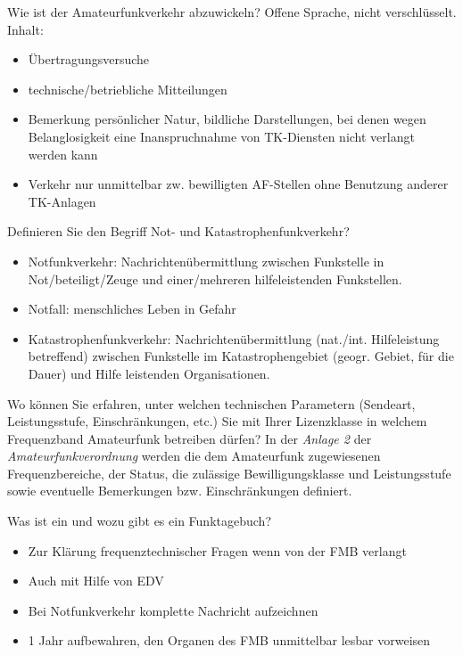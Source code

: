 \documentclass[avery5371,grid,frame,a4paper]{flashcards}
\newcommand{\card}[3]{
  \begin{flashcard}[{\chap} -- #1]{#2}#3\end{flashcard}
}
\begin{document}
\card{31}{Wie ist der Amateurfunkverkehr abzuwickeln?}{
  Offene Sprache, nicht verschlüsselt.
  Inhalt:
  \begin{itemize}
    \item Übertragungsversuche
    \item technische/betriebliche Mitteilungen
    \item Bemerkung persönlicher Natur, bildliche Darstellungen, bei denen wegen Belanglosigkeit eine Inanspruchnahme von TK-Diensten nicht verlangt werden kann
    \item Verkehr nur unmittelbar zw. bewilligten AF-Stellen ohne Benutzung anderer TK-Anlagen
  \end{itemize}
}

\card{32}{Definieren Sie den Begriff Not- und Katastrophenfunkverkehr?}{
  \begin{itemize}
    \item Notfunkverkehr: Nachrichtenübermittlung zwischen Funkstelle in Not/beteiligt/Zeuge und einer/mehreren hilfeleistenden Funkstellen.
    \item Notfall: menschliches Leben in Gefahr
    \item Katastrophenfunkverkehr: Nachrichtenübermittlung (nat./int. Hilfeleistung betreffend) zwischen Funkstelle im Katastrophengebiet (geogr. Gebiet, für die Dauer) und Hilfe leistenden Organisationen.
  \end{itemize}
}

\card{33}{Wo können Sie erfahren, unter welchen technischen Parametern (Sendeart, Leistungsstufe, Einschränkungen, etc.) Sie mit Ihrer Lizenzklasse in welchem Frequenzband Amateurfunk betreiben dürfen?}{
  In der \emph{Anlage 2} der \emph{Amateurfunkverordnung} werden die dem Amateurfunk zugewiesenen Frequenzbereiche, der Status, die zulässige Bewilligungsklasse und Leistungsstufe sowie eventuelle Bemerkungen bzw. Einschränkungen definiert.
}

\card{34}{Was ist ein und wozu gibt es ein Funktagebuch?}{
  \begin{itemize} 
    \item Zur Klärung frequenztechnischer Fragen wenn von der FMB verlangt
    \item Auch mit Hilfe von EDV
    \item Bei Notfunkverkehr komplette Nachricht aufzeichnen
    \item 1 Jahr aufbewahren, den Organen des FMB unmittelbar lesbar vorweisen
  \end{itemize}
}
\end{document}
